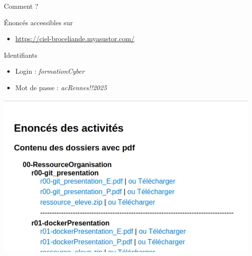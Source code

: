 \documentclass[12pt, handout]{beamer}
\begin{document}
\begin{frame}{Comment ?}

\begin{block}{Énoncés accessibles sur }
\begin{itemize}
\item \url{https://ciel-broceliande.myasustor.com/}
\end{itemize}
\end{block}

\begin{block}{Identifiants}
\begin{itemize}
\item Login : \textit{formationCyber}
\item Mot de passe : \textit{acRennes!!2025}
\end{itemize}
\end{block}


\begin{center}
\includegraphics[scale=0.5]{./ressource/enonceSite}
\end{center}

\end{frame}
\end{document}
